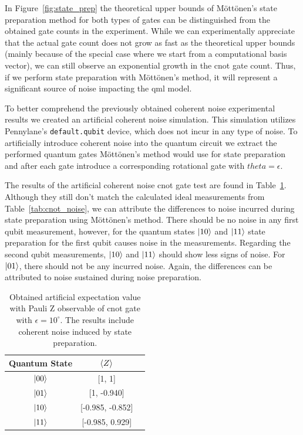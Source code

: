 In Figure~\ref{fig:state_prep} the theoretical upper bounds of
Möttönen's state preparation method for both types of gates can
be distinguished from the obtained gate counts in the experiment.
While we can experimentally appreciate that the actual gate count
does not grow as fast as the theoretical upper bounds (mainly because
of the special case where we start from a computational basis vector),
we can still observe an exponential growth in the \ac{cnot} gate count.
Thus, if we perform state preparation with Möttönen's method, it will
represent a significant source of noise impacting the \ac{qml} model. \

To better comprehend the previously obtained coherent noise experimental
results we created an artificial coherent noise simulation. This
simulation utilizes Pennylane's \colorbox{inline_gray}{\lstinline|default.qubit|}
device, which does not incur in any type of noise. To artificially
introduce coherent noise into the quantum circuit we extract the
performed quantum gates Möttönen's method would use for state
preparation and after each gate introduce a corresponding rotational
gate with \(theta = \epsilon\). \

The results of the artificial coherent noise \ac{cnot} gate test are found
in Table~\ref{tab:cnot_artificial_noise}. Although they still don't
match the calculated ideal measurements from Table~\ref{tab:cnot_noise},
we can attribute the differences to noise incurred during state preparation
using Möttönen's method. There should be no noise in any first qubit
measurement, however, for the quantum states \(\ket{10}\) and \(\ket{11}\)
state preparation for the first qubit causes noise in the measurements.
Regarding the second qubit measurements, \(\ket{10}\) and \(\ket{11}\)
should show less signs of noise. For \(\ket{01}\), there should not be
any incurred noise. Again, the differences can be attributed to noise
sustained during noise preparation. \

\begin{table}[h]
  \centering
  \begin{tabular}{|c|c|c|}
    \hline
    Quantum State & \(\expval{Z}\) \\
    \hline
    \(\ket{00}\) & [1, 1] \\
    \hline
    \(\ket{01}\) & [1, -0.940] \\
    \hline
    \(\ket{10}\) & [-0.985, -0.852] \\
    \hline
    \(\ket{11}\) & [-0.985, 0.929] \\
    \hline
  \end{tabular}
  \caption{Obtained artificial expectation value with Pauli Z observable of \ac{cnot} gate with \(\epsilon = 10^{\circ}\).
  The results include coherent noise induced by state preparation. }\label{tab:cnot_artificial_noise}
\end{table} \

